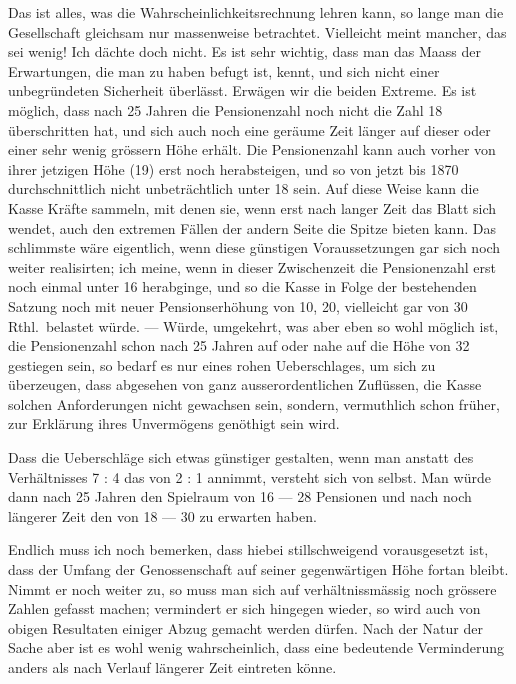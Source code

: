 \documentclass[12pt,a4paper]{article}
\begin{document}
Das ist alles, was die Wahrscheinlichkeitsrechnung lehren kann, so lange man die Gesellschaft gleichsam nur massenweise betrachtet. Vielleicht meint mancher, das sei wenig! Ich d\"achte doch nicht. Es ist sehr wichtig, dass man das Maass der Erwartungen, die man zu haben befugt ist, kennt, und sich nicht einer unbegr\"undeten Sicherheit \"uberl\"asst. Erw\"agen wir die beiden Extreme. Es ist m\"oglich, dass nach 25 Jahren die Pensionenzahl noch nicht die Zahl 18 \"uberschritten hat, und sich auch noch eine ger\"aume Zeit l\"anger auf dieser oder einer sehr wenig gr\"ossern H\"ohe erh\"alt. Die Pensionenzahl kann auch vorher von ihrer jetzigen H\"ohe (19) erst noch herabsteigen, und so von jetzt bis 1870 durchschnittlich nicht unbetr\"achtlich unter 18 sein. Auf diese Weise kann die Kasse Kr\"afte sammeln, mit denen sie, wenn erst nach langer Zeit das Blatt sich wendet, auch den extremen F\"allen der andern Seite die Spitze bieten kann. Das schlimmste w\"are eigentlich, wenn diese g\"unstigen Voraussetzungen gar sich noch weiter realisirten; ich meine, wenn in dieser Zwischenzeit die Pensionenzahl erst noch einmal unter 16 herabginge, und so die Kasse in Folge der bestehenden Satzung noch mit neuer Pensionserh\"ohung von 10, 20, vielleicht gar von 30 Rthl.\ belastet w\"urde. --- W\"urde, umgekehrt, was aber eben so wohl m\"oglich ist, die Pensionenzahl schon nach 25 Jahren auf oder nahe auf die H\"ohe von 32 gestiegen sein, so bedarf es nur eines rohen Ueberschlages, um sich zu \"uberzeugen, dass abgesehen von ganz ausserordentlichen Zufl\"ussen, die Kasse solchen Anforderungen nicht gewachsen sein, sondern, vermuthlich schon fr\"uher, zur Erkl\"arung ihres Unverm\"ogens gen\"othigt sein wird.

Dass die Ueberschl\"age sich etwas g\"unstiger gestalten, wenn man anstatt des Verh\"altnisses 7 : 4 das von 2 : 1 annimmt, versteht sich von selbst. Man w\"urde dann nach 25 Jahren den Spielraum von 16 --- 28 Pensionen und nach noch l\"angerer Zeit den von 18 --- 30 zu erwarten haben.

Endlich muss ich noch bemerken, dass hiebei stillschweigend vorausgesetzt ist, dass der Umfang der Genossenschaft auf seiner gegenw\"artigen H\"ohe fortan bleibt. Nimmt er noch weiter zu, so muss man sich auf verh\"altnissm\"assig noch gr\"ossere Zahlen gefasst machen; vermindert er sich hingegen wieder, so wird auch von obigen Resultaten einiger Abzug gemacht werden d\"urfen. Nach der Natur der Sache aber ist es wohl wenig wahrscheinlich, dass eine bedeutende Verminderung anders als nach Verlauf l\"angerer Zeit eintreten k\"onne.
\end{document}
